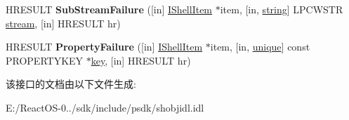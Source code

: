 \begin{DoxyCompactItemize}
\item 
\mbox{\label{interface_i_transfer_advise_sink_a642799992fb3168d4da4eabca470b341}} 
H\+R\+E\+S\+U\+LT {\bfseries Sub\+Stream\+Failure} (\mbox{[}in\mbox{]} \hyperlink{interface_i_shell_item}{I\+Shell\+Item} $\ast$item, \mbox{[}in, \hyperlink{structstring}{string}\mbox{]} L\+P\+C\+W\+S\+TR \hyperlink{structstream}{stream}, \mbox{[}in\mbox{]} H\+R\+E\+S\+U\+LT hr)
\item 
\mbox{\label{interface_i_transfer_advise_sink_a8e90fc2693250a66322a659a396c2876}} 
H\+R\+E\+S\+U\+LT {\bfseries Property\+Failure} (\mbox{[}in\mbox{]} \hyperlink{interface_i_shell_item}{I\+Shell\+Item} $\ast$item, \mbox{[}in, \hyperlink{interfaceunique}{unique}\mbox{]} const P\+R\+O\+P\+E\+R\+T\+Y\+K\+EY $\ast$\hyperlink{structkey}{key}, \mbox{[}in\mbox{]} H\+R\+E\+S\+U\+LT hr)
\end{DoxyCompactItemize}


该接口的文档由以下文件生成\+:\begin{DoxyCompactItemize}
\item 
E\+:/\+React\+O\+S-\/0../sdk/include/psdk/shobjidl.\+idl\end{DoxyCompactItemize}
